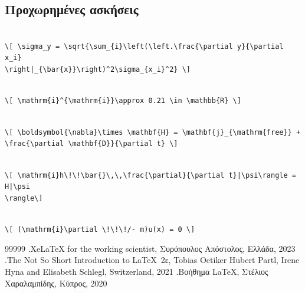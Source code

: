 \documentclass[a4paper, 12pt, oneside, xelatex, final]{article}
\begin{document}
	\subsection{Προχωρημένες ασκήσεις}
	\begin{solution}\hfill\\
	\verb+\[ \sigma_y = \sqrt{\sum_{i}\left(\left.\frac{\partial y}{\partial x_i}+\\ \phantom{.} \quad \verb+\right|_{\bar{x}}\right)^2\sigma_{x_i}^2} \]+
	\end{solution}
	\begin{solution}\hfill\\
	\verb+\[ \mathrm{i}^{\mathrm{i}}\approx 0.21 \in \mathbb{R} \]+
	\end{solution}
	\begin{solution}\hfill\\
	\verb|\[ \boldsymbol{\nabla}\times \mathbf{H} = \mathbf{j}_{\mathrm{free}} +|\\ \phantom{.} \quad \verb|\frac{\partial \mathbf{D}}{\partial t} \]|
	\end{solution}
	\begin{solution}\hfill\\
	\verb+\[ \mathrm{i}h\!\!\bar{}\,\,\frac{\partial}{\partial t}|\psi\rangle = H|\psi+\\ \phantom{.} \quad \verb+\rangle\]+
	\end{solution}
	\begin{solution}\hfill\\
	\verb|\[ (\mathrm{i}\partial \!\!\!/- m)u(x) = 0 \]|
	\end{solution}

\newpage
\begin{thebibliography}{99999}
	\bibitem  .XeLaTeX for the working scientist, Συρόπουλος Απόστολος, Ελλάδα, 2023
	\bibitem .The Not So Short Introduction to \LaTeX\ 2ε, Tobias Oetiker Hubert Partl, Irene Hyna and Elisabeth Schlegl, Switzerland, 2021
	\bibitem  .Βοήθημα LaTeX, Στέλιος Χαραλαμπίδης, Κύπρος, 2020
\end{thebibliography}
\end{document}
